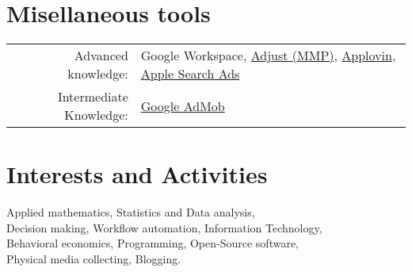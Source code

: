\documentclass[a4paper,10pt]{article} %
\begin{document}
%
%
%

\section{Misellaneous tools}

\begin{tabular}{rl}
Advanced knowledge: & Google Workspace,
    \href{https://www.adjust.com}{Adjust (MMP)},
    \href{https://www.applovin.com}{Applovin},
    \href{https://searchads.apple.com}{Apple Search Ads} \\
    Intermediate Knowledge: & \href{https://admob.google.com}{Google AdMob}
\end{tabular}



\section{Interests and Activities}

Applied mathematics, Statistics and Data analysis,\\
Decision making, Workflow automation, Information Technology,\\
Behavioral economics, Programming, Open-Source software,\\
Physical media collecting, Blogging.
\end{document}
